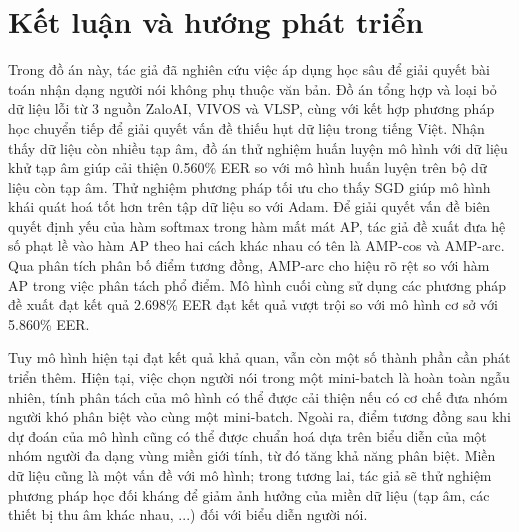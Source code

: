 \documentclass[a4paper, 13pt, oneside]{report}
\begin{document}
\tableofcontents
\pagebreak
\listoffigures
\listoftables

\printglossary[type=\acronymtype,style=long, title=List of Abbreviations]
\printglossary
\pagebreak

\setcounter{page}{1}






\chapter{Kết luận và hướng phát triển}
Trong đồ án này, tác giả đã nghiên cứu việc áp dụng học sâu để giải quyết bài toán nhận dạng người nói không phụ thuộc văn bản. Đồ án tổng hợp và loại bỏ dữ liệu lỗi từ 3 nguồn ZaloAI, VIVOS và VLSP, cùng với kết hợp phương pháp học chuyển tiếp để giải quyết vấn đề thiếu hụt dữ liệu trong tiếng Việt. Nhận thấy dữ liệu còn nhiều tạp âm, đồ án thử nghiệm huấn luyện mô hình với dữ liệu khử tạp âm giúp cải thiện 0.560\% EER so với mô hình huấn luyện trên bộ dữ liệu còn tạp âm. Thử nghiệm phương pháp tối ưu cho thấy SGD giúp mô hình khái quát hoá tốt hơn trên tập dữ liệu so với Adam. Để giải quyết vấn đề biên quyết định yếu của hàm softmax trong hàm mất mát AP, tác giả đề xuất đưa hệ số phạt lề vào hàm AP theo hai cách khác nhau có tên là AMP-cos và AMP-arc. Qua phân tích phân bố điểm tương đồng, AMP-arc cho hiệu rõ rệt so với hàm AP trong việc phân tách phổ điểm. Mô hình cuối cùng sử dụng các phương pháp đề xuất đạt kết quả 2.698\% EER đạt kết quả vượt trội so với mô hình cơ sở với 5.860\% EER.

Tuy mô hình hiện tại đạt kết quả khả quan, vẫn còn một số thành phần cần phát triển thêm. Hiện tại, việc chọn người nói trong một mini-batch là hoàn toàn ngẫu nhiên, tính phân tách của mô hình có thể được cải thiện nếu có cơ chế đưa nhóm người khó phân biệt vào cùng một mini-batch. Ngoài ra, điểm tương đồng sau khi dự đoán của mô hình cũng có thể được chuẩn hoá dựa trên biểu diễn của một nhóm người đa dạng vùng miền giới tính, từ đó tăng khả năng phân biệt. Miền dữ liệu cũng là một vấn đề với mô hình; trong tương lai, tác giả sẽ thử nghiệm phương pháp học đối kháng để giảm ảnh hưởng của miền dữ liệu (tạp âm, các thiết bị thu âm khác nhau, ...) đối với biểu diễn người nói.

\pagebreak
% 



\end{document}
